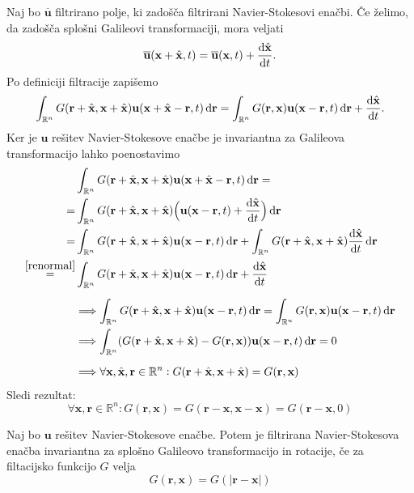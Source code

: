 \documentclass[mat2, tisk]{fmfdelo}
\newcommand{\R}{\mathbb R}
\newcommand{\bd}{\textbf}
\begin{document}
\begin{dokaz}
   Naj bo $\overline{\bd{u}}$ filtrirano polje, ki zadošča filtrirani Navier-Stokesovi enačbi.
  Če želimo, da zadošča splošni Galileovi transformaciji, mora veljati 
  $$
  \overline{\bd{u}}(\bd{x} + \hat{\bd{x}}, t) = \overline{\bd{u}}(\bd{x}, t) + \frac{\dif \hat{\bd{x}}}{\dif t}.
  $$
  Po definiciji filtracije zapišemo
  \begin{align*}
  \int_{\R^n} G(\bd{r} + \hat{\bd{x}}, \bd{x} + \hat{\bd{x}}) \bd{u}(\bd{x} + \hat{\bd{x}} - \bd{r}, t) \dif \bd{r} = \int_{\R^n} G(\bd{r}, \bd{x}) \bd{u}(\bd{x} - \bd{r}, t)\dif \bd{r} + \frac{\dif \hat{\bd{x}}}{\dif t} .
  \end{align*}
  Ker je $\bd{u}$ rešitev Navier-Stokesove enačbe je invariantna za Galileova transformacijo lahko poenostavimo 
  \begin{align*}
    &\int_{\R^n} G(\bd{r} + \hat{\bd{x}}, \bd{x} + \hat{\bd{x}}) \bd{u}(\bd{x} + \hat{\bd{x}} - \bd{r}, t) \dif \bd{r} = \\
    =& \int_{\R^n} G(\bd{r} + \hat{\bd{x}}, \bd{x} + \hat{\bd{x}}) \Big(\bd{u}(\bd{x} - \bd{r}, t) + \frac{\dif \hat{\bd{x}}}{\dif t} \Big)\dif \bd{r} \\
    =& \int_{\R^n} G(\bd{r} + \hat{\bd{x}}, \bd{x} + \hat{\bd{x}}) \bd{u}(\bd{x} - \bd{r}, t)\dif \bd{r}  + \int_{\R^n} G(\bd{r} + \hat{\bd{x}}, \bd{x} + \hat{\bd{x}}) \frac{\dif \hat{\bd{x}}}{\dif t} \dif \bd{r}\\
    \stackrel{\ref{renormal}}{=}& \int_{\R^n} G(\bd{r} + \hat{\bd{x}}, \bd{x} + \hat{\bd{x}}) \bd{u}(\bd{x} - \bd{r}, t)\dif \bd{r}  + \frac{\dif \hat{\bd{x}}}{\dif t}\\[2mm]
    &\Longrightarrow \int_{\R^n} G(\bd{r} + \hat{\bd{x}}, \bd{x} + \hat{\bd{x}}) \bd{u}(\bd{x} - \bd{r}, t)\dif \bd{r} = \int_{\R^n} G(\bd{r}, \bd{x}) \bd{u}(\bd{x} - \bd{r}, t)\dif \bd{r}\\
    &\Longrightarrow  \int_{\R^n} (G(\bd{r} + \hat{\bd{x}}, \bd{x} + \hat{\bd{x}}) - G(\bd{r}, \bd{x})) \bd{u}(\bd{x} - \bd{r}, t)\dif \bd{r} = 0\\[2mm]
    &\Longrightarrow \forall \bd{x}, \hat{\bd{x}}, \bd{r} \in \R^n: G(\bd{r} + \hat{\bd{x}}, \bd{x} + \hat{\bd{x}}) = G(\bd{r}, \bd{x})
  \end{align*}
  Sledi rezultat: 
  $$
  \forall \bd{x}, \bd{r} \in \R^n: G(\bd{r}, \bd{x}) = G(\bd{r} - \bd{x}, \bd{x} - \bd{x}) = G(\bd{r} - \bd{x}, 0)
  $$
\end{dokaz}

\begin{lema}
  Naj bo $\bd{u}$ rešitev Navier-Stokesove enačbe. Potem je filtrirana Navier-Stokesova enačba 
  invariantna za splošno Galileovo transformacijo in rotacije, če za filtacijsko funkcijo $G$ velja 
  $$
  G(\bd{r}, \bd{x}) = G(|\bd{r} - \bd{x}|)
  $$
\end{lema}
\end{document}
